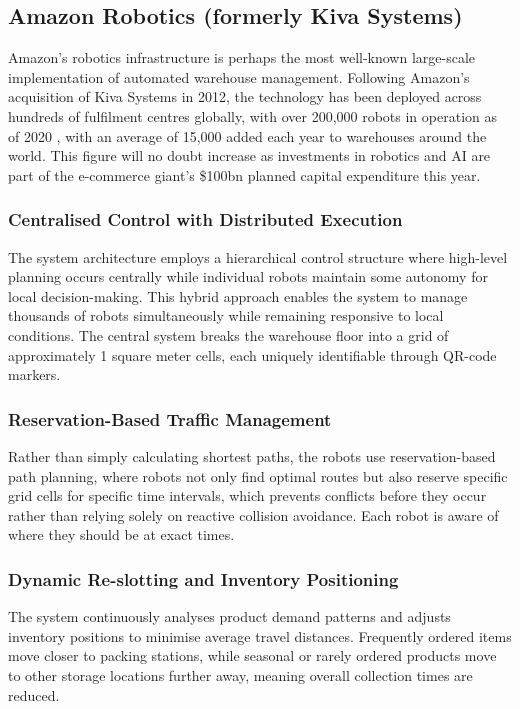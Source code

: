 \newpage

\subsection{Amazon Robotics (formerly Kiva Systems)}

Amazon's robotics infrastructure is perhaps the most well-known large-scale implementation of automated warehouse management. Following Amazon's acquisition of Kiva Systems in 2012, the technology has been deployed across hundreds of fulfilment centres globally, with over 200,000 robots in operation as of 2020 \cite{edwards_2020_amazon}, with an average of 15,000 added each year to warehouses around the world. This figure will no doubt increase as investments in robotics and AI are part of the e-commerce giant’s \$100bn planned capital expenditure this year. \cite{clifford_2025_amazon}

\subsubsection{Centralised Control with Distributed Execution}
The system architecture employs a hierarchical control structure where high-level planning occurs centrally while individual robots maintain some autonomy for local decision-making. This hybrid approach enables the system to manage thousands of robots simultaneously while remaining responsive to local conditions. The central system breaks the warehouse floor into a grid of approximately 1 square meter cells, each uniquely identifiable through QR-code markers.

\subsubsection{Reservation-Based Traffic Management}
Rather than simply calculating shortest paths, the robots use reservation-based path planning, where robots not only find optimal routes but also reserve specific grid cells for specific time intervals, which prevents conflicts before they occur rather than relying solely on reactive collision avoidance. Each robot is aware of where they should be at exact times.

\subsubsection{Dynamic Re-slotting and Inventory Positioning}
The system continuously analyses product demand patterns and adjusts inventory positions to minimise average travel distances. Frequently ordered items move closer to packing stations, while seasonal or rarely ordered products move to other storage locations further away, meaning overall collection times are reduced.

